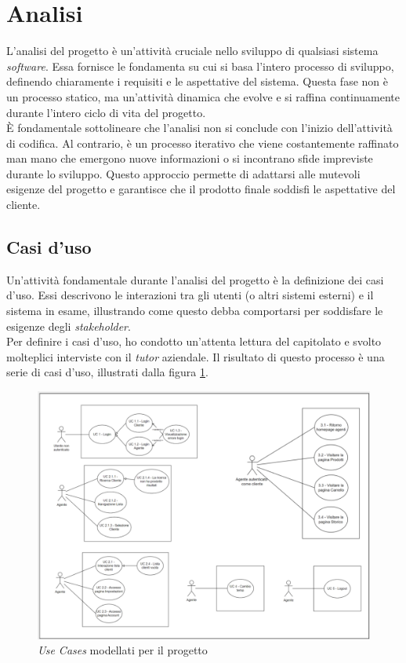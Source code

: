 \section{Analisi}

L'analisi del progetto è un'attività cruciale nello sviluppo di qualsiasi sistema \textit{software}. Essa fornisce le 
fondamenta su cui si basa l'intero processo di sviluppo, definendo chiaramente i requisiti e le aspettative 
del sistema. Questa fase non è un processo statico, ma un'attività dinamica che evolve e si raffina continuamente durante 
l'intero ciclo di vita del progetto.\\
È fondamentale sottolineare che l'analisi non si conclude con l'inizio dell'attività di codifica. Al contrario, 
è un processo iterativo che viene costantemente raffinato man mano che emergono nuove informazioni o si incontrano sfide 
impreviste durante lo sviluppo. Questo approccio permette di adattarsi alle mutevoli esigenze del progetto e 
garantisce che il prodotto finale soddisfi le aspettative del cliente.

\subsection{Casi d'uso}

Un'attività fondamentale durante l'analisi del progetto è la definizione dei casi d'uso. Essi descrivono le interazioni tra gli utenti 
(o altri sistemi esterni) e il sistema in esame, illustrando come questo debba comportarsi per 
soddisfare le esigenze degli \textit{stakeholder}.\\
Per definire i casi d'uso, ho condotto un'attenta lettura del capitolato e svolto molteplici interviste con il \textit{tutor} 
aziendale. Il risultato di questo processo è una serie di casi d'uso, illustrati dalla figura \ref{fig:uc}.

\begin{figure}[H]
    \vspace{2em}
    \centering
    \includegraphics[width=0.7\columnwidth]{img/use_cases.png}
    \caption{\textit{Use Cases} modellati per il progetto}
    \label{fig:uc}
\end{figure}

